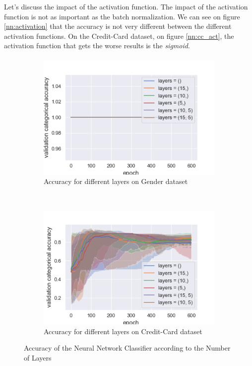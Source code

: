 \documentclass[10pt]{article}
\begin{document}
			Let's discuss the impact of the activation function. The impact of the activation function is not as important as the batch normalization. We can see on figure \ref{nn:activation} that the accuracy is not very different between the different activation functions. On the Credit-Card dataset, on figure \ref{nn:cc_act}, the activation function that gets the worse results is the \textit{sigmoid}.
		\paragraph*{}
			\begin{figure}[h]
				\centering
				\begin{subfigure}[]{0.45\columnwidth}
					\centering
					\includegraphics[width=\linewidth]{../graphics/per_gender_epoch_score_type_layers.png}
					\caption{Accuracy for different layers on Gender dataset}
					\label{nn:g_layers}
				\end{subfigure}
				~
				\begin{subfigure}[]{0.45\columnwidth}
					\centering
					\includegraphics[width=\linewidth]{../graphics/per_creditcard_epoch_score_type_layers.png}
					\caption{Accuracy for different layers on Credit-Card dataset}
					\label{nn:cc_layers}
				\end{subfigure}
				\caption{Accuracy of the Neural Network Classifier according to the Number of Layers}
				\label{nn:layers}
			\end{figure}
\end{document}

